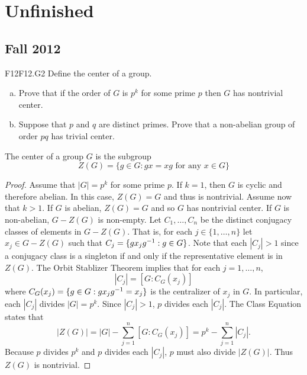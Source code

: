 \documentclass[../AlgebraQualSolutions.tex]{subfiles}
\begin{document}
\section{Unfinished}


	\subsection{Fall 2012}

	\begin{prob}{F12}{F12.G2}
	Define the center of a group.
	\begin{enumerate}[(a)]
	\item Prove that if the order of $G$ is $p^k$ for some prime $p$ then $G$ has nontrivial center.
	\item Suppose that $p$ and $q$ are distinct primes. Prove that a non-abelian group of order $pq$ has trivial center.
	\end{enumerate}
	\end{prob}
	
	The center of a group $G$ is the subgroup
		\[Z(G) = \{g \in G: gx = xg \textrm{ for any $x \in G$} \} \]
	
	\begin{proof}
	Assume that $|G| = p^k$ for some prime $p$. If $k = 1$, then $G$ is cyclic and therefore abelian. In this case, $Z(G) = G$ and thus is nontrivial. Assume now that $k > 1$. If $G$ is abelian, $Z(G) = G$ and so $G$ has nontrivial center. If $G$ is non-abelian, $G - Z(G)$ is non-empty. Let $C_1, \ldots, C_n$ be the distinct conjugacy classes of elements in $G - Z(G)$. That is, for each $j \in \{1, \ldots, n\}$ let $x_j \in G - Z(G)$ such that $C_j = \{gx_jg^{-1}: g \in G\}$. Note that each $|C_j| > 1$ since a conjugacy class is a singleton if and only if the representative element is in $Z(G)$. The Orbit Stablizer Theorem implies that for each $j = 1, \ldots, n$,
		\[ |C_j| =  [G: C_G(x_j)] \]
	where $C_G(x_j) = \{g \in G: gx_jg^{-1} = x_j \}$ is the centralizer of $x_j$ in $G$. In particular, each $|C_j|$ divides $|G| = p^k$. Since $|C_j| > 1$, $p$ divides each $|C_j|$. The Class Equation states that 
		\[|Z(G)| = |G| - \sum_{j=1}^n [G: C_G(x_j)] = p^k -  \sum_{j=1}^n |C_j| .\]
	Because $p$ divides $p^k$ and $p$ divides each $|C_j|$, $p$ must also divide $|Z(G)|$. Thus $Z(G)$ is nontrivial.
	\end{proof}
\end{document}
